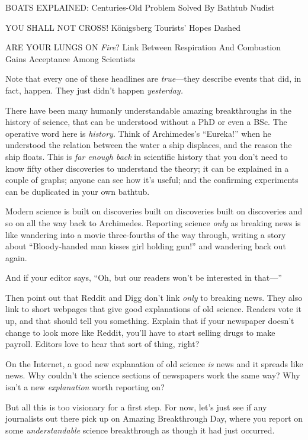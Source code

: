 {
 BOATS EXPLAINED: Centuries-Old Problem Solved By Bathtub Nudist}

{
 YOU SHALL NOT CROSS! Königsberg Tourists' Hopes
Dashed}

{
 ARE YOUR LUNGS ON \textit{Fire}? Link Between Respiration And
Combustion Gains Acceptance Among Scientists}

{
 Note that every one of these headlines are \textit{true}{}---they
describe events that did, in fact, happen. They just
didn't happen \textit{yesterday.}}

{
 There have been many humanly understandable amazing breakthroughs
in the history of science, that can be understood without a PhD or even
a BSc. The operative word here is \textit{history}. Think of
Archimedes's
``Eureka!'' when he understood the
relation between the water a ship displaces, and the reason the ship
floats. This is \textit{far enough back} in scientific history that you
don't need to know fifty other discoveries to
understand the theory; it can be explained in a couple of graphs;
anyone can see how it's useful; and the confirming
experiments can be duplicated in your own bathtub.}

{
 Modern science is built on discoveries built on discoveries built
on discoveries and so on all the way back to Archimedes. Reporting
science \textit{only} as breaking news is like wandering into a movie
three-fourths of the way through, writing a story about
``Bloody-handed man kisses girl holding
gun!'' and wandering back out again.}

{
 And if your editor says, ``Oh, but our readers
won't be interested in that---''}

{
 Then point out that Reddit and Digg don't link
\textit{only} to breaking news. They also link to short webpages that
give good explanations of old science. Readers vote it up, and that
should tell you something. Explain that if your newspaper
doesn't change to look more like Reddit,
you'll have to start selling drugs to make payroll.
Editors love to hear that sort of thing, right?}

{
 On the Internet, a good new explanation of old science \textit{is}
news and it spreads like news. Why couldn't the science
sections of newspapers work the same way? Why isn't a
new \textit{explanation} worth reporting on?}

{
 But all this is too visionary for a first step. For now,
let's just see if any journalists out there pick up on
Amazing Breakthrough Day, where you report on some
\textit{understandable} science breakthrough as though it had just
occurred.}

